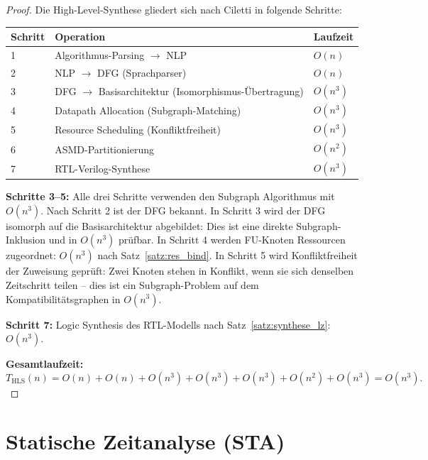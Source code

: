 ﻿\documentclass[a4paper,12pt]{article}
\theoremstyle{definition}
\begin{document}
\begin{proof}
  Die High-Level-Synthese gliedert sich nach Ciletti \cite[S.~550, Abb.~9-2]{ciletti2011}
  in folgende Schritte:

  \begin{center}
  \begin{tabular}{lll}
    \toprule
    Schritt & Operation & Laufzeit \\
    \midrule
    1 & Algorithmus-Parsing $\to$ NLP & $O(n)$ \\
    2 & NLP $\to$ DFG (Sprachparser) & $O(n)$ \\
    3 & DFG $\to$ Basisarchitektur (Isomorphismus-Übertragung) & $O(n^3)$ \\
    4 & Datapath Allocation (Subgraph-Matching) & $O(n^3)$ \\
    5 & Resource Scheduling (Konfliktfreiheit) & $O(n^3)$ \\
    6 & ASMD-Partitionierung & $O(n^2)$ \\
    7 & RTL-Verilog-Synthese & $O(n^3)$ \\
    \bottomrule
  \end{tabular}
  \end{center}

  \textbf{Schritte 3--5:} Alle drei Schritte verwenden den Subgraph Algorithmus mit
  $O(n^3)$. Nach Schritt 2 ist der DFG bekannt. In Schritt 3 wird der DFG isomorph
  auf die Basisarchitektur abgebildet: Dies ist eine direkte Subgraph-Inklusion und
  in $O(n^3)$ prüfbar. In Schritt 4 werden FU-Knoten Ressourcen zugeordnet: $O(n^3)$
  nach Satz~\ref{satz:res_bind}. In Schritt 5 wird Konfliktfreiheit der Zuweisung
  geprüft: Zwei Knoten stehen in Konflikt, wenn sie sich denselben Zeitschritt teilen
  -- dies ist ein Subgraph-Problem auf dem Kompatibilitätsgraphen in $O(n^3)$.

  \textbf{Schritt 7:} Logic Synthesis des RTL-Modells nach Satz~\ref{satz:synthese_lz}:
  $O(n^3)$.

  \textbf{Gesamtlaufzeit:}
  \[
    T_{\text{HLS}}(n) = O(n) + O(n) + O(n^3) + O(n^3) + O(n^3) + O(n^2) + O(n^3)
    = O(n^3).
  \]
\end{proof}

\section{Statische Zeitanalyse (STA)}
\end{document}
